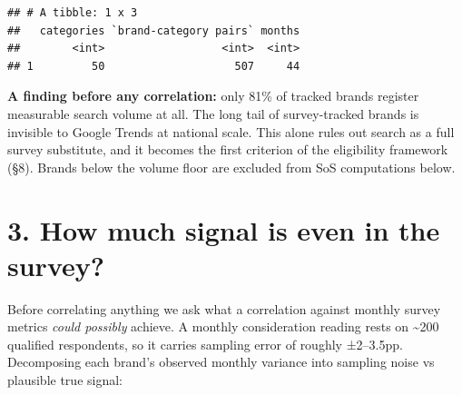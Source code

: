 \documentclass[
]{article}
\newenvironment{Shaded}{\begin{snugshade}}{\end{snugshade}}
\newcommand{\AttributeTok}[1]{\textcolor[rgb]{0.13,0.29,0.53}{#1}}
\newcommand{\ConstantTok}[1]{\textcolor[rgb]{0.56,0.35,0.01}{#1}}
\newcommand{\FunctionTok}[1]{\textcolor[rgb]{0.13,0.29,0.53}{\textbf{#1}}}
\newcommand{\NormalTok}[1]{#1}
\newcommand{\OtherTok}[1]{\textcolor[rgb]{0.56,0.35,0.01}{#1}}
\newcommand{\SpecialCharTok}[1]{\textcolor[rgb]{0.81,0.36,0.00}{\textbf{#1}}}
\newcommand{\StringTok}[1]{\textcolor[rgb]{0.31,0.60,0.02}{#1}}
\begin{document}
\begin{verbatim}
## # A tibble: 1 x 3
##   categories `brand-category pairs` months
##        <int>                  <int>  <int>
## 1         50                    507     44
\end{verbatim}

\begin{Shaded}
\end{Shaded}

\textbf{A finding before any correlation:} only 81\% of tracked brands
register measurable search volume at all. The long tail of
survey-tracked brands is invisible to Google Trends at national scale.
This alone rules out search as a full survey substitute, and it becomes
the first criterion of the eligibility framework (§8). Brands below the
volume floor are excluded from SoS computations below.

\hypertarget{noise}{%
\section{3. How much signal is even in the survey?}\label{noise}}

Before correlating anything we ask what a correlation against monthly
survey metrics \emph{could possibly} achieve. A monthly consideration
reading rests on \textasciitilde200 qualified respondents, so it carries
sampling error of roughly ±2--3.5pp. Decomposing each brand's observed
monthly variance into sampling noise vs plausible true signal:
\end{document}
